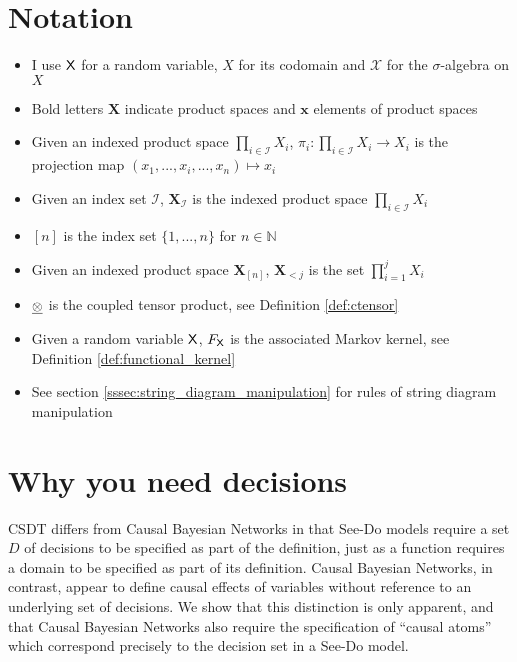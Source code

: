 

\section{Notation}

\begin{itemize}
	\item I use $\mathsf{X}$ for a random variable, $X$ for its codomain and $\mathcal{X}$ for the $\sigma$-algebra on $X$
	\item Bold letters $\mathbf{X}$ indicate product spaces and $\mathbf{x}$ elements of product spaces
	\item Given an indexed product space $\prod_{i\in \mathcal{I}} X_i$, $\pi_i:\prod_{i\in \mathcal{I}} X_i\to X_i$ is the projection map $(x_1,...,x_i,...,x_n)\mapsto x_i$
	\item Given an index set $\mathcal{I}$, $\mathbf{X}_{\mathcal{I}}$ is the indexed product space $\prod_{i\in \mathcal{I}} X_i$
	\item $[n]$ is the index set $\{1,...,n\}$ for $n\in\mathbb{N}$
	\item Given an indexed product space $\mathbf{X}_{[n]}$, $\mathbf{X}_{<j}$ is the set $\prod_{i=1}^j X_i$
	\item $\underline{\otimes}$ is the coupled tensor product, see Definition \ref{def:ctensor}
	\item Given a random variable $\mathsf{X}$, $F_{\mathsf{X}}$ is the associated Markov kernel, see Definition \ref{def:functional_kernel}
	\item See section \ref{sssec:string_diagram_manipulation} for rules of string diagram manipulation
\end{itemize}


\section{Why you need decisions}

CSDT differs from Causal Bayesian Networks in that See-Do models require a set $D$ of decisions to be specified as part of the definition, just as a function requires a domain to be specified as part of its definition. Causal Bayesian Networks, in contrast, appear to define causal effects of variables without reference to an underlying set of decisions. We show that this distinction is only apparent, and that Causal Bayesian Networks also require the specification of ``causal atoms'' which correspond precisely to the decision set in a See-Do model.

